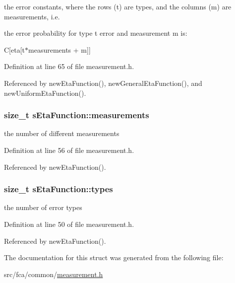 the error constants, where the rows (t) are types, and the columns (m) are measurements, i.\-e. 

the error probability for type t error and measurement m is\-:

\-C\mbox{[}eta\mbox{[}t$\ast$measurements + m\mbox{]}\mbox{]} 

\-Definition at line 65 of file measurement.\-h.



\-Referenced by new\-Eta\-Function(), new\-General\-Eta\-Function(), and new\-Uniform\-Eta\-Function().

\hypertarget{structsEtaFunction_aa323ef11935cd1e8d6ef56405ab96cf8}{
\subsubsection[{measurements}]{\setlength{\rightskip}{0pt plus 5cm}size\-\_\-t {\bf s\-Eta\-Function\-::measurements}}}\label{structsEtaFunction_aa323ef11935cd1e8d6ef56405ab96cf8}


the number of different measurements 



\-Definition at line 56 of file measurement.\-h.



\-Referenced by new\-Eta\-Function().

\hypertarget{structsEtaFunction_afd94a9856047e0987c5e8667a4838b71}{
\subsubsection[{types}]{\setlength{\rightskip}{0pt plus 5cm}size\-\_\-t {\bf s\-Eta\-Function\-::types}}}\label{structsEtaFunction_afd94a9856047e0987c5e8667a4838b71}


the number of error types 



\-Definition at line 50 of file measurement.\-h.



\-Referenced by new\-Eta\-Function().



\-The documentation for this struct was generated from the following file\-:\begin{DoxyCompactItemize}
\item 
src/fca/common/\hyperlink{common_2measurement_8h}{measurement.\-h}\end{DoxyCompactItemize}

